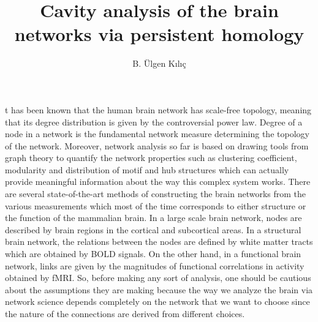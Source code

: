 \documentclass[9pt,twocolumn,twoside,lineno]{pnas-new}
\title{Cavity analysis of the brain networks via persistent homology}
\author[a,1]{B. Ülgen Kılıç}
\affil[a]{University at Buffalo, Department of Mathematics}
\begin{document}
\maketitle
\thispagestyle{firststyle}

t has been known that the human brain network has scale-free topology, meaning that its degree distribution is given by the controversial power law\cite{smallworld1,smallworld2}. Degree of a node in a network is the fundamental network measure determining the topology of the network. Moreover, network analysis so far is based on drawing tools from graph theory to quantify the network properties such as clustering coefficient, modularity and distribution of motif and hub structures which can actually provide meaningful information about the way this complex system works\cite{graphtheory}. There are several state-of-the-art methods of constructing the brain networks from the various measurements \cite{stateoftheart} which most of the time corresponds to either structure or the function of the mammalian  brain.  In a large scale brain network, nodes are described by brain regions in the cortical and subcortical areas. In a structural brain network, the relations between the nodes are defined by white matter tracts which are obtained by BOLD signals. On the other hand, in a functional brain network, links are given by the magnitudes of functional correlations in activity obtained by fMRI. So, before making any sort of analysis, one should be cautious about the assumptions they are making because the way we analyze the brain via network science depends completely on the network that we want to choose since the nature of the connections are derived from different choices.
\end{document}
